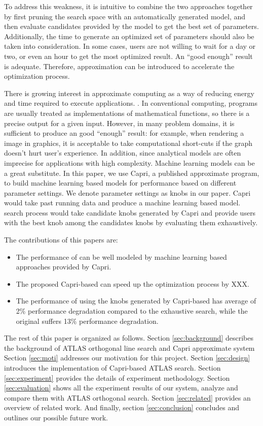 \par
To address this weakness, it is intuitive to combine the two approaches together by first pruning the search
space with an automatically generated model, and then evaluate candidates
provided by the model to get the best set of parameters.
Additionally, the time to generate an optimized set of parameters
should also be taken into consideration. In some cases, users are not willing
to wait for a day or two, or even an hour to get the most optimized result. An
``good enough'' result is adequate. Therefore, approximation can be introduced
to accelerate the optimization process.

There is growing interest in approximate computing as a way of reducing energy
and time required to execute applications. \cite{ansel2011language,
baek2010green, sidiroglou2011managing, swaminathan2015case}. In conventional
computing, programs are usually treated as implementations of mathematical
functions, so there is a precise output for a given input.
However, in many problem domains, it is sufficient to produce an good ``enough''
result: for example, when rendering a image in graphics, it is
acceptable to take computational short-cuts if the graph doesn't hurt user's
experience. In addition, since analytical models are often imprecise for
applications with high complexity. Machine learning models can be a great
substitute. In this paper, we use Capri\cite{sui2016proactive}, a published
approximate program, to build machine learning based models for \gem performance
based on different parameter settings. We denote parameter settings as knobs in
our paper. Capri would take past \atl running data and produce a machine
learning based model. \atl search process would take candidate knobs generated
by Capri and provide users with the best knob among the candidates knobs by
evaluating them exhaustively.


The contributions of this papers are:
\begin{itemize}
\item The performance of \gem can be well modeled by machine learning based
approaches provided by Capri.
\item The proposed Capri-based \atl can speed up the optimization process by XXX.
\item The performance of \gem using the knobs generated by Capri-based \atl
has average of 2\% performance degradation compared to the exhaustive search,
while the original \atl suffers 13\% performance degradation.
\end{itemize}

\par
The rest of this paper is organized as follows. Section \ref{sec:background} describes the background of ATLAS
orthogonal line search and Capri approximate system
Section \ref{sec:moti} addresses our motivation for this project.
Section \ref{sec:design} introduces the implementation of Capri-based ATLAS search.
Section \ref{sec:experiment} provides the details of experiment methodology.
Section \ref{sec:evaluation} shows all the experiment results of our system, analyze and compare them with ATLAS orthogonal search.
Section \ref{sec:related} provides an overview of related work.
And finally, section \ref{sec:conclusion} concludes and outlines our possible future work.
